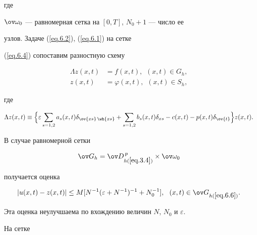 где


$\ov\omega_0$ --- равномерная сетка на $[0,T]$, $N_0+1$ --- число ее


узлов. Задаче (\ref{eq.6.2}), (\ref{eq.6.1}) на сетке


(\ref{eq.6.4}) сопоставим разностную схему \cite{2}


\begin{equation} \label{eq.6.5}


\begin{split}


\Lambda z(x,t)&=f(x,t), \ \ (x,t)\in G_h,\\


z(x,t)&=\varphi(x,t), \ \ (x,t)\in S_h,


\end{split}


\end{equation}


где


$$


\Lambda z(x,t)\equiv \Big\{ \varepsilon\sum\limits_{s=1,2}


a_s(x,t)\delta_{\ov{xs}\,\wh{xs}}+


\sum\limits_{s=1,2}b_s(x,t)


\delta_{xs}-c(x,t)-p(x,t)\delta_{\ov{t}}\Big\}z(x,t).


$$





В случае равномерной сетки


\begin{equation} \label{eq.6.6}


\ov G_h=\ov D_{h(\ref{eq.3.4})}^{\,p}\times \ov\omega_0


\end{equation}


получается оценка


\begin{equation} \label{eq.6.7}


|u(x,t)-z(x,t)|\le M [N^{-1}(\varepsilon+N^{-1})^{-1}+N_0^{-1}], \ \ 


(x,t)\in \ov G_{h(\ref{eq.6.6})}.


\end{equation}


Эта оценка неулучшаема по вхождению величин $N$, $N_0$ и $\varepsilon$.





На сетке


